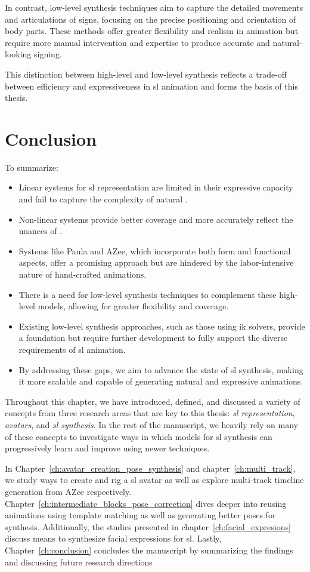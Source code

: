 \documentclass[../../main.tex]{subfiles}
\begin{document}
In contrast, low-level synthesis techniques aim to capture the detailed movements and articulations of signs, focusing on the precise positioning and orientation of body parts. These methods offer greater flexibility and realism in animation but require more manual intervention and expertise to produce accurate and natural-looking signing.

This distinction between high-level and low-level synthesis reflects a trade-off between efficiency and expressiveness in \gls{sl} animation and forms the basis of this thesis.

\section{Conclusion}
\label{ch:background_work:conclusion}

To summarize:

\begin{itemize} 
  \item Linear systems for \gls{sl} representation are limited in their expressive capacity and fail to capture the complexity of natural .
  \item Non-linear systems provide better coverage and more accurately reflect the nuances of .
  \item Systems like Paula and AZee, which incorporate both form and functional aspects, offer a promising approach but are hindered by the labor-intensive nature of hand-crafted animations.
  \item There is a need for low-level synthesis techniques to complement these high-level models, allowing for greater flexibility and coverage.
  \item Existing low-level synthesis approaches, such as those using \gls{ik} solvers, provide a foundation but require further development to fully support the diverse requirements of \gls{sl} animation.
  \item By addressing these gaps, we aim to advance the state of \gls{sl} synthesis, making it more scalable and capable of generating natural and expressive animations.
\end{itemize}

Throughout this chapter, we have introduced, defined, and discussed a variety of concepts from three research areas that are key to this thesis: \textit{\gls{sl} representation}, \textit{avatars}, and \textit{\gls{sl} synthesis}. In the rest of the manuscript, we heavily rely on many of these concepts to investigate ways in which models for \gls{sl} synthesis can progressively learn and improve using newer techniques.

In Chapter~\ref{ch:avatar_creation_pose_synthesis} and chapter~\ref{ch:multi_track}, we study ways to create and rig a \gls{sl} avatar as well as explore multi-track timeline generation from AZee respectively. Chapter~\ref{ch:intermediate_blocks_pose_correction} dives deeper into reusing animations using template matching as well as generating better poses for synthesis. Additionally, the studies presented in chapter~\ref{ch:facial_expresions} discuss means to synthesize facial expressions for \gls{sl}. Lastly, Chapter~\ref{ch:conclusion} concludes the manuscript by summarizing the findings and discussing future research directions
\end{document}

